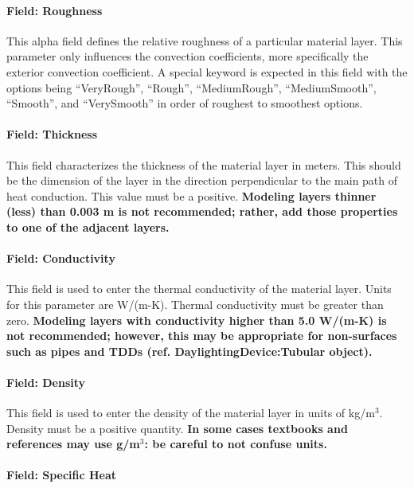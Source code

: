 \paragraph{Field: Roughness}\label{field-roughness-000}

This alpha field defines the relative roughness of a particular material layer. This parameter only influences the convection coefficients, more specifically the exterior convection coefficient. A special keyword is expected in this field with the options being ``VeryRough'', ``Rough'', ``MediumRough'', ``MediumSmooth'', ``Smooth'', and ``VerySmooth'' in order of roughest to smoothest options.

\paragraph{Field: Thickness}\label{field-thickness}

This field characterizes the thickness of the material layer in meters. This should be the dimension of the layer in the direction perpendicular to the main path of heat conduction. This value must be a positive. \textbf{Modeling layers thinner (less) than 0.003 m is not recommended; rather, add those properties to one of the adjacent layers.}

\paragraph{Field: Conductivity}\label{field-conductivity}

This field is used to enter the thermal conductivity of the material layer. Units for this parameter are W/(m-K). Thermal conductivity must be greater than zero. \textbf{Modeling layers with conductivity higher than 5.0 W/(m-K) is not recommended; however, this may be appropriate for non-surfaces such as pipes and TDDs (ref. DaylightingDevice:Tubular object).}

\paragraph{Field: Density}\label{field-density}

This field is used to enter the density of the material layer in units of kg/m\(^{3}\). Density must be a positive quantity. \textbf{In some cases textbooks and references may use g/m\(^{3}\): be careful to not confuse units.}

\paragraph{Field: Specific Heat}\label{field-specific-heat}

